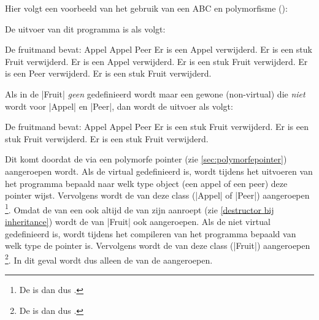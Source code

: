 \begin{cpplstShortInline}
Hier volgt een voorbeeld van het gebruik van een ABC en polymorfisme
\iftoggle{ebook}{ }{\\}%
():

De uitvoer van dit programma is als volgt:
\begin{coutput}
De fruitmand bevat:
  Appel
  Appel
  Peer
Er is een Appel verwijderd.
Er is een stuk Fruit verwijderd.
Er is een Appel verwijderd.
Er is een stuk Fruit verwijderd.
Er is een Peer verwijderd.
Er is een stuk Fruit verwijderd.
\end{coutput}

Als in de  |Fruit| \emph{geen}  gedefinieerd wordt maar een gewone (non-virtual)  die \emph{niet}  wordt voor |Appel| en |Peer|, dan wordt de uitvoer als volgt:
\begin{coutput}
De fruitmand bevat:
  Appel
  Appel
  Peer
Er is een stuk Fruit verwijderd.
Er is een stuk Fruit verwijderd.
Er is een stuk Fruit verwijderd.
\end{coutput}

Dit komt doordat de  via een polymorfe pointer (zie \cref{sec:polymorfepointer}) aangeroepen wordt.
Als de  virtual gedefinieerd is, wordt tijdens het uitvoeren van het programma bepaald naar welk type object (een appel of een peer) deze pointer wijst.
Vervolgens wordt de  van deze class (|Appel| of |Peer|) aangeroepen%
\footnote{%
    De  is dan dus \emph{}.
}.
Omdat de  van een  ook altijd de  van zijn  aanroept (zie \cref{destructor bij inheritance}) wordt de  van |Fruit| ook aangeroepen.
Als de  niet virtual gedefinieerd is, wordt tijdens het compileren van het programma bepaald van welk type de pointer is.
Vervolgens wordt de  van deze class (|Fruit|) aangeroepen%
\footnote{%
    De  is dan dus \emph{}.
}.
In dit geval wordt dus alleen de  van de  aangeroepen.


\end{cpplstShortInline}
